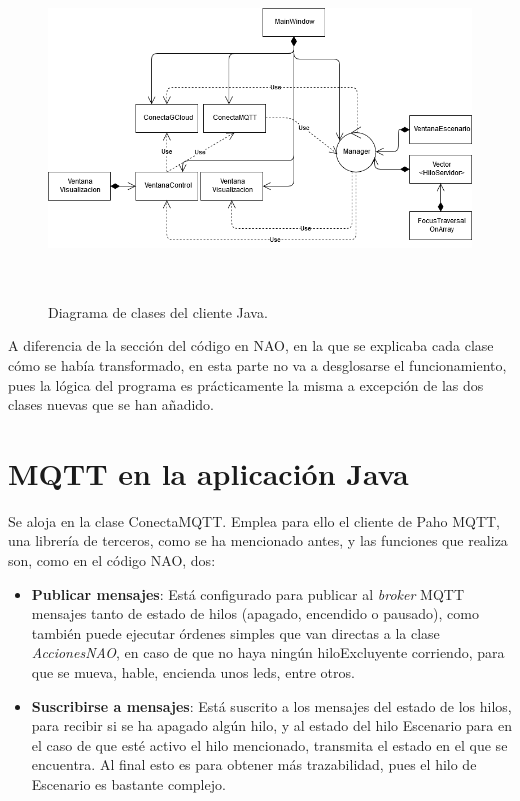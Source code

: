 \documentclass[12pt,spanish,listoffigures,listoftables]{tfgetsinf}
\begin{document}
\begin{figure}[!h]
	\centering
	\includegraphics[height=9cm]{img/ClasesJava}
	\caption{Diagrama de clases del cliente Java.}
	\label{figura:clasesjava}
\end{figure}

A diferencia de la sección del código en NAO, en la que se explicaba cada clase cómo se había transformado, en esta parte no va a desglosarse el funcionamiento, pues la lógica del programa es prácticamente la misma a excepción de las dos clases nuevas que se han añadido.

\section{MQTT en la aplicación Java}

Se aloja en la clase ConectaMQTT. Emplea para ello el cliente de Paho MQTT, una librería de terceros, como se ha mencionado antes, y las funciones que realiza son, como en el código NAO, dos:
\begin{itemize}
	\item \textbf{Publicar mensajes}: Está configurado para publicar al \textit{broker} MQTT mensajes tanto de estado de hilos (apagado, encendido o pausado), como también puede ejecutar órdenes simples que van directas a la clase \textit{AccionesNAO}, en caso de que no haya ningún hiloExcluyente corriendo, para que se mueva, hable, encienda unos leds, entre otros.
	\item \textbf{Suscribirse a mensajes}: Está suscrito a los mensajes del estado de los hilos, para recibir si se ha apagado algún hilo, y al estado del hilo Escenario para en el caso de que esté activo el hilo mencionado, transmita el estado en el que se encuentra. Al final esto es para obtener más trazabilidad, pues el hilo de Escenario es bastante complejo.
\end{itemize}
\end{document}
